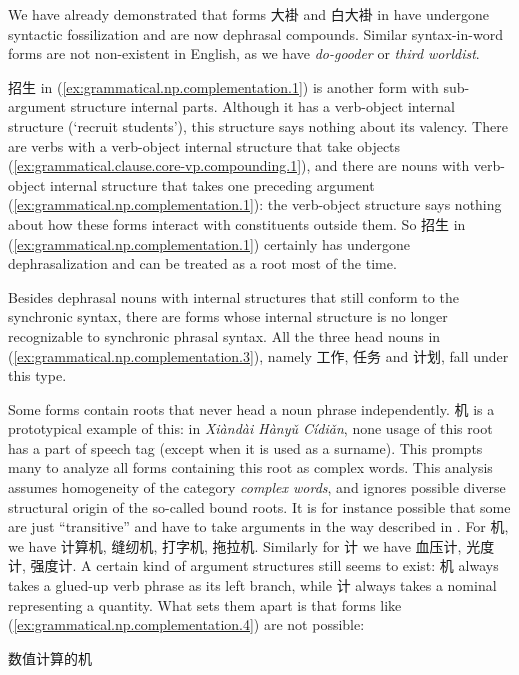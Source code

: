 \documentclass[UTF8, a4paper, oneside, scheme=plain, 12pt]{ctexrep}
\newcommand*{\term}[1]{\emph{#1}}
\newcommand{\form}[1]{\emph{#1}}
\newcommand{\work}[1]{\textit{#1}}
\newcommand{\translate}[1]{`#1'}
\begin{document}
We have already demonstrated that forms 大褂 and 白大褂 in 
have undergone syntactic fossilization and are now dephrasal compounds.
Similar syntax-in-word forms are not non-existent in English,
as we have \form{do-gooder} or \form{third worldist}.

招生 in (\ref{ex:grammatical.np.complementation.1}) is another form with sub-argument structure internal parts.
Although it has a verb-object internal structure (\translate{recruit students}),
this structure says nothing about its valency.
There are verbs with a verb-object internal structure
that take objects (\ref{ex:grammatical.clause.core-vp.compounding.1}),
and there are nouns with verb-object internal structure 
that takes one preceding argument (\ref{ex:grammatical.np.complementation.1}):
the verb-object structure says nothing about how these forms
interact with constituents outside them.
So 招生 in (\ref{ex:grammatical.np.complementation.1})
certainly has undergone dephrasalization and
can be treated as a root most of the time.

Besides dephrasal nouns with internal structures that still conform to the synchronic syntax,
there are forms whose internal structure is no longer recognizable
to synchronic phrasal syntax.
All the three head nouns in (\ref{ex:grammatical.np.complementation.3}),
namely 工作, 任务 and 计划, fall under this type.

Some forms contain roots that never head a noun phrase independently.
机 is a prototypical example of this:
in \work{Xiàndài Hànyǔ Cídiǎn}, none usage of this root has a part of speech tag
(except when it is used as a surname).
This prompts many to analyze all forms containing this root as complex words.
This analysis assumes homogeneity of the category \term{complex words},
and ignores possible diverse structural origin of the so-called bound roots.
It is for instance possible that some are just ``transitive'' and have to take arguments
in the way described in .
For 机, we have 计算机, 缝纫机, 打字机, 拖拉机.
Similarly for 计 we have 血压计, 光度计, 强度计.
A certain kind of argument structures still seems to exist:
机 always takes a glued-up verb phrase as its left branch,
while 计 always takes a nominal representing a quantity.
What sets them apart is that forms like (\ref{ex:grammatical.np.complementation.4}) are not possible:

\begin{exe}
    \ex *数值计算的机
\end{exe}
\end{document}
